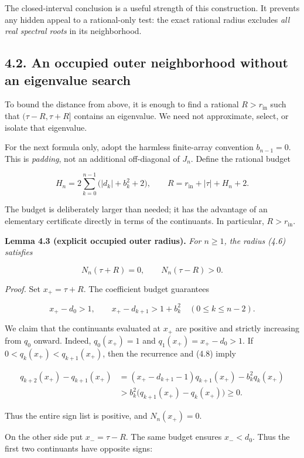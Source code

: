 \documentclass[
  11pt,
]{article}
\begin{document}
The closed-interval conclusion is a useful strength of this
construction. It prevents any hidden appeal to a rational-only test: the
exact rational radius excludes \emph{all real spectral roots} in its
neighborhood.

\subsection{4.2. An occupied outer neighborhood without an eigenvalue
search}\label{an-occupied-outer-neighborhood-without-an-eigenvalue-search}

To bound the distance from above, it is enough to find a rational
\(R>r_{\mathrm{in}}\) such that \((\tau-R,\tau+R]\) contains an
eigenvalue. We need not approximate, select, or isolate that eigenvalue.

For the next formula only, adopt the harmless finite-array convention
\(b_{n-1}=0\). This is \emph{padding}, not an additional off-diagonal of
\(J_n\). Define the rational budget

\[
H_n=2\sum_{k=0}^{n-1}\bigl(|d_k|+b_k^2+2\bigr),
\qquad
\boxed{R=r_{\mathrm{in}}+|\tau|+H_n+2.}
\tag{4.6}
\]

The budget is deliberately larger than needed; it has the advantage of
an elementary certificate directly in terms of the continuants. In
particular, \(R>r_{\mathrm{in}}\).

\textbf{Lemma 4.3 (explicit occupied outer radius).} \emph{For
\(n\ge1\), the radius (4.6) satisfies}

\[
N_n(\tau+R)=0,
\qquad N_n(\tau-R)>0.
\tag{4.7}
\]

\emph{Proof.} Set \(x_+=\tau+R\). The coefficient budget guarantees

\[
x_+-d_0>1,
\qquad
x_+-d_{k+1}>1+b_k^2
\quad(0\le k\le n-2).
\tag{4.8}
\]

We claim that the continuants evaluated at \(x_+\) are positive and
strictly increasing from \(q_0\) onward. Indeed, \(q_0(x_+)=1\) and
\(q_1(x_+)=x_+-d_0>1\). If \(0<q_k(x_+)<q_{k+1}(x_+)\), then the
recurrence and (4.8) imply

\[
\begin{aligned}
q_{k+2}(x_+)-q_{k+1}(x_+)
&=(x_+-d_{k+1}-1)q_{k+1}(x_+)-b_k^2q_k(x_+)\\
&>b_k^2\bigl(q_{k+1}(x_+)-q_k(x_+)\bigr)\ge0.
\end{aligned}
\]

Thus the entire sign list is positive, and \(N_n(x_+)=0\).

On the other side put \(x_-=\tau-R\). The same budget ensures
\(x_-<d_0\). Thus the first two continuants have opposite signs:
\end{document}
